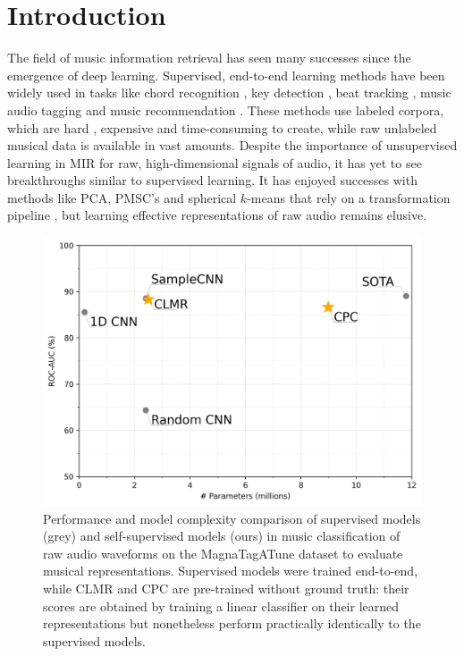 \chapter{Introduction}\label{sec:introduction}
The field of music information retrieval has seen many successes since the emergence of deep learning. Supervised, end-to-end learning methods have been widely used in tasks like chord recognition \cite{korzeniowski_fully_2016, chen_harmony_2019}, key detection \cite{korzeniowski_end--end_2017}, beat tracking \cite{bock_joint_2016}, music audio tagging \cite{pons_end--end_2017} and music recommendation \cite{van_den_oord_deep_2013}. These methods use labeled corpora, which are hard \cite{doi:10.1080/09298215.2019.1613436}, expensive and time-consuming to create, while raw unlabeled musical data is available in vast amounts. Despite the importance of unsupervised learning in MIR for raw, high-dimensional signals of audio, it has yet to see breakthroughs similar to supervised learning. It has enjoyed successes with methods like PCA, PMSC's and spherical $k$-means that rely on a transformation pipeline \cite{hamel2011temporal, dieleman_feature_learning}, but learning effective representations of raw audio remains elusive. 

\begin{figure}[t]
    \includegraphics[width=\columnwidth]{figs/performance.png}
    \caption{Performance and model complexity comparison of supervised models (grey) and self-supervised models (ours) in music classification of raw audio waveforms on the MagnaTagATune dataset to evaluate musical representations. Supervised models were trained end-to-end, while CLMR and CPC are pre-trained without ground truth: their scores are obtained by training a linear classifier on their learned representations but nonetheless perform practically identically to the supervised models.}
    \label{fig:example}
\end{figure}

